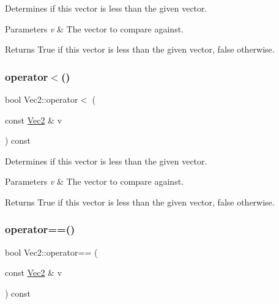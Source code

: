 Determines if this vector is less than the given vector.


\begin{DoxyParams}{Parameters}
{\em v} & The vector to compare against.\\
\hline
\end{DoxyParams}
\begin{DoxyReturn}{Returns}
True if this vector is less than the given vector, false otherwise. 
\end{DoxyReturn}
\mbox{\label{classVec2_aad24b95fb51746343f06c504a7a05681}} 
\subsubsection{\texorpdfstring{operator$<$()}{operator<()}\hspace{0.1cm}{\footnotesize\ttfamily [2/2]}}
{\footnotesize\ttfamily bool Vec2\+::operator$<$ (\begin{DoxyParamCaption}\item[{const \hyperlink{classVec2}{Vec2} \&}]{v }\end{DoxyParamCaption}) const\hspace{0.3cm}{\ttfamily [inline]}}

Determines if this vector is less than the given vector.


\begin{DoxyParams}{Parameters}
{\em v} & The vector to compare against.\\
\hline
\end{DoxyParams}
\begin{DoxyReturn}{Returns}
True if this vector is less than the given vector, false otherwise. 
\end{DoxyReturn}
\mbox{\label{classVec2_a08e7dcf7a04bd18d56d41dc03104ba64}} 
\subsubsection{\texorpdfstring{operator==()}{operator==()}\hspace{0.1cm}{\footnotesize\ttfamily [1/2]}}
{\footnotesize\ttfamily bool Vec2\+::operator== (\begin{DoxyParamCaption}\item[{const \hyperlink{classVec2}{Vec2} \&}]{v }\end{DoxyParamCaption}) const\hspace{0.3cm}{\ttfamily [inline]}}

